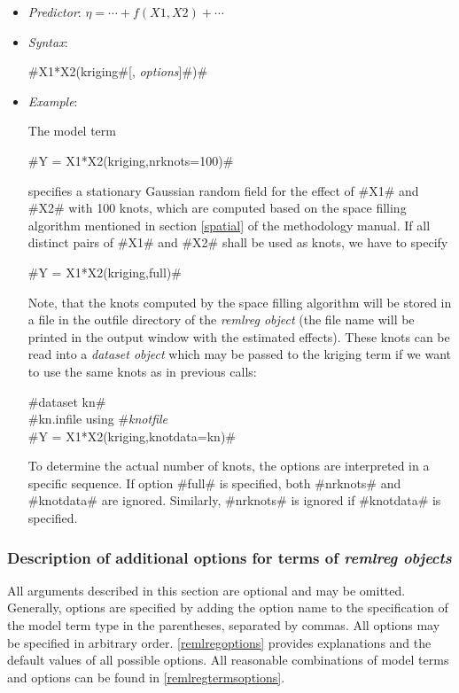 \begin{itemize}
\item[] {\em Predictor}: $\eta= \cdots + f(X1,X2) + \cdots$
\item[] {\em Syntax}:

#X1*X2(kriging#[, {\em options}]#)# \item[] {\em Example}:

The model term

#Y = X1*X2(kriging,nrknots=100)#

specifies a stationary Gaussian random field for the effect of
#X1# and #X2# with 100 knots, which are computed based on the
space filling algorithm mentioned in section \ref*{spatial} of the
methodology manual. If all distinct pairs of #X1# and #X2# shall
be used as knots, we have to specify

#Y = X1*X2(kriging,full)#

Note, that the knots computed by the space filling algorithm will
be stored in a file in the outfile directory of the {\em remlreg
object} (the file name will be printed in the output window with
the estimated effects). These knots can be read into a {\em
dataset object} which may be passed to the kriging term if we want
to use the same knots as in previous calls:

 #dataset kn#\\
 #kn.infile using #{\em knotfile}\\
 #Y = X1*X2(kriging,knotdata=kn)#

To determine the actual number of knots, the options are
interpreted in a specific sequence. If option #full# is specified,
both #nrknots# and #knotdata# are ignored. Similarly, #nrknots# is
ignored if #knotdata# is specified.

\end{itemize}

\subsubsection{Description of additional options for terms of {\em remlreg objects}}
\label{remlreglocaloptions}

All arguments described in this section are optional and may be
omitted. Generally, options are specified by adding the option name
to the specification of the model term type in the parentheses,
separated by commas. All options may be specified in arbitrary
order. \autoref{remlregoptions} provides explanations and the
default values of all possible options. All reasonable combinations
of model terms and options can be found in
\autoref{remlregtermsoptions}.


